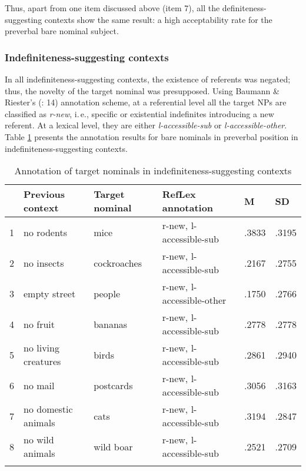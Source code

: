 \documentclass[output=paper]{langsci/langscibook}
\begin{document}
Thus, apart from one item discussed above (item 7), all the definiteness-suggesting contexts show the same result: a high acceptability rate for the preverbal bare nominal subject. 

\subsubsection{Indefiniteness-suggesting contexts}\label{2sec:342}

In all indefiniteness-suggesting contexts, the existence of referents was negated; thus, the novelty of the target nominal was presupposed. Using Baumann \& Riester's (\citeyear{baumann:riester:12}: 14) annotation scheme, at a referential level all the target NPs are classified as {\emph{r-new}}, i.\,e., specific or existential indefinites introducing a new referent. At a lexical level, they are either {\emph{l-accessible-sub}} or {\emph{l-accessible-other}}. Table \ref{2table:2} presents the annotation results for bare nominals in preverbal position in indefiniteness-suggesting contexts.

\begin{table}[H]
{\small{
\begin{tabular}{m{1pt}lllm{20pt}m{20pt}}
\lsptoprule
 & Previous context & Target nominal & RefLex annotation & M & SD \\ 
\midrule
1 & no rodents & mice & r-new, l-accessible-sub & .3833 & .3195 \\ 
2 & no insects & cockroaches & r-new, l-accessible-sub & .2167 & .2755 \\ 
3 & empty street & people & r-new, l-accessible-other & .1750 & .2766\\ 
4 & no fruit & bananas & r-new, l-accessible-sub & .2778 & .2778\\ 
5 & no living creatures & birds & r-new, l-accessible-sub & .2861 & .2940\\ 
6 & no mail & postcards & r-new, l-accessible-sub & .3056	 & .3163\\ 
7 & no domestic animals & cats & r-new, l-accessible-sub & .3194 & .2847\\ 
8 & no wild animals & wild boar & r-new, l-accessible-sub & .2521 & .2709\\
\lspbottomrule
\end{tabular}
}}
\caption{Annotation of target nominals in indefiniteness-suggesting contexts}\label{2table:2}
\end{table}
\end{document}
